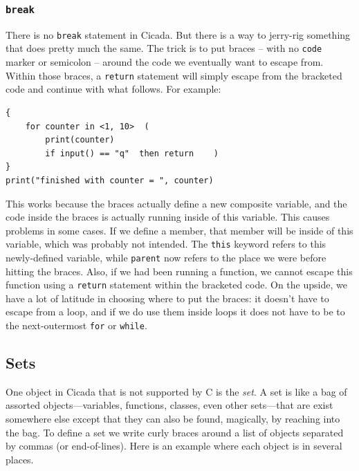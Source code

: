 \documentclass{article}
\newenvironment{code}{
       \begin{list}{}{
               \setlength{\leftmargin}{.4in}
               \setlength{\rightmargin}{0in}
               \setlength{\topsep}{.2in}
       }
       \small
       \item[] }
       { \end{list}   }
\begin{document}



\subsubsection{\texttt{break}} 

There is no \verb#break# statement in Cicada.  But there is a way to jerry-rig something that does pretty much the same.  The trick is to put braces -- with no \verb#code# marker or semicolon -- around the code we eventually want to escape from.  Within those braces, a \verb#return# statement will simply escape from the bracketed code and continue with what follows.  For example:

\begin{code} \begin{verbatim}
{
    for counter in <1, 10>  (
        print(counter)
        if input() == "q"  then return    )
}
print("finished with counter = ", counter)
\end{verbatim} \end{code}

\noindent This works because the braces actually define a new composite variable, and the code inside the braces is actually running inside of this variable.  This causes problems in some cases.  If we define a member, that member will be inside of this variable, which was probably not intended.  The \verb#this# keyword refers to this newly-defined variable, while \verb#parent# now refers to the place we were before hitting the braces.  Also, if we had been running a function, we cannot escape this function using a \verb#return# statement within the bracketed code.  On the upside, we have a lot of latitude in choosing where to put the braces:  it doesn't have to escape from a loop, and if we do use them inside loops it does not have to be to the next-outermost \verb#for# or \verb#while#.








\subsection{Sets} 

One object in Cicada that is not supported by C is the \emph{set}.  A set is like a bag of assorted objects---variables, functions, classes, even other sets---that are exist somewhere else except that they can also be found, magically, by reaching into the bag.  To define a set we write curly braces around a list of objects separated by commas (or end-of-lines).  Here is an example where each object is in several places.
\end{document}
